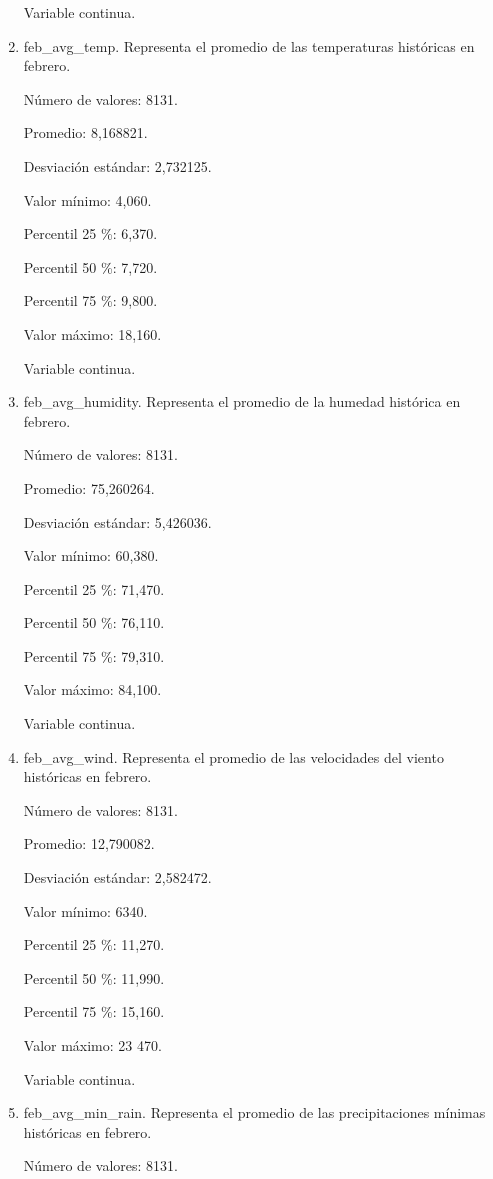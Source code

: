 \begin{enumerate}
	Variable continua.

	\item feb\_avg\_temp. Representa el promedio de las temperaturas históricas en febrero.
	
	Número de valores: 8131.
	
	Promedio: 8,168821.
	
	Desviación estándar: 2,732125.
	
	Valor mínimo: 4,060.
	
	Percentil 25 \%: 6,370.
	
	Percentil 50 \%: 7,720.
	
	Percentil 75 \%: 9,800.
	
	Valor máximo: 18,160.
	
	Variable continua.

	\item feb\_avg\_humidity. Representa el promedio de la humedad histórica en febrero.
	
	Número de valores: 8131.
	
	Promedio: 75,260264.
	
	Desviación estándar: 5,426036.
	
	Valor mínimo: 60,380.
	
	Percentil 25 \%: 71,470.
	
	Percentil 50 \%: 76,110.
	
	Percentil 75 \%: 79,310.
	
	Valor máximo: 84,100.
	
	Variable continua.

	\item feb\_avg\_wind. Representa el promedio de las velocidades del viento históricas en febrero.
	
	Número de valores: 8131.
	
	Promedio: 12,790082.
	
	Desviación estándar: 2,582472.
	
	Valor mínimo: 6340.
	
	Percentil 25 \%: 11,270.
	
	Percentil 50 \%: 11,990.
	
	Percentil 75 \%: 15,160.
	
	Valor máximo: 23 470.
	
	Variable continua.

	\item feb\_avg\_min\_rain. Representa el promedio de las precipitaciones mínimas históricas en febrero.
	
	Número de valores: 8131.
	

\end{enumerate}
